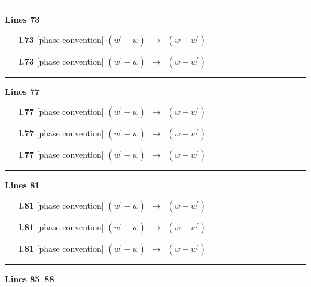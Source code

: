 \documentclass[10pt]{article}
\begin{document}
\noindent\rule{\linewidth}{0.3pt}\par\noindent\textbf{Lines 73} \par
\begin{itemize}[leftmargin=2.2em,itemsep=1pt,topsep=2pt]
\item[\textbf{l.73}] \textsf{\small [phase convention]} $\displaystyle (w^{\prime}-w)$\ $\longrightarrow$\ $\displaystyle (w-w^{\prime})$
\item[\textbf{l.73}] \textsf{\small [phase convention]} $\displaystyle (w^{\prime}-w)$\ $\longrightarrow$\ $\displaystyle (w-w^{\prime})$
\end{itemize}
\noindent\rule{\linewidth}{0.3pt}\par\noindent\textbf{Lines 77} \par
\begin{itemize}[leftmargin=2.2em,itemsep=1pt,topsep=2pt]
\item[\textbf{l.77}] \textsf{\small [phase convention]} $\displaystyle (w^{\prime}-w)$\ $\longrightarrow$\ $\displaystyle (w-w^{\prime})$
\item[\textbf{l.77}] \textsf{\small [phase convention]} $\displaystyle (w^{\prime}-w)$\ $\longrightarrow$\ $\displaystyle (w-w^{\prime})$
\item[\textbf{l.77}] \textsf{\small [phase convention]} $\displaystyle (w^{\prime}-w)$\ $\longrightarrow$\ $\displaystyle (w-w^{\prime})$
\end{itemize}
\noindent\rule{\linewidth}{0.3pt}\par\noindent\textbf{Lines 81} \par
\begin{itemize}[leftmargin=2.2em,itemsep=1pt,topsep=2pt]
\item[\textbf{l.81}] \textsf{\small [phase convention]} $\displaystyle (w^{\prime}-w)$\ $\longrightarrow$\ $\displaystyle (w-w^{\prime})$
\item[\textbf{l.81}] \textsf{\small [phase convention]} $\displaystyle (w^{\prime}-w)$\ $\longrightarrow$\ $\displaystyle (w-w^{\prime})$
\item[\textbf{l.81}] \textsf{\small [phase convention]} $\displaystyle (w^{\prime}-w)$\ $\longrightarrow$\ $\displaystyle (w-w^{\prime})$
\end{itemize}
\noindent\rule{\linewidth}{0.3pt}\par\noindent\textbf{Lines 85--88} \par
\end{document}
